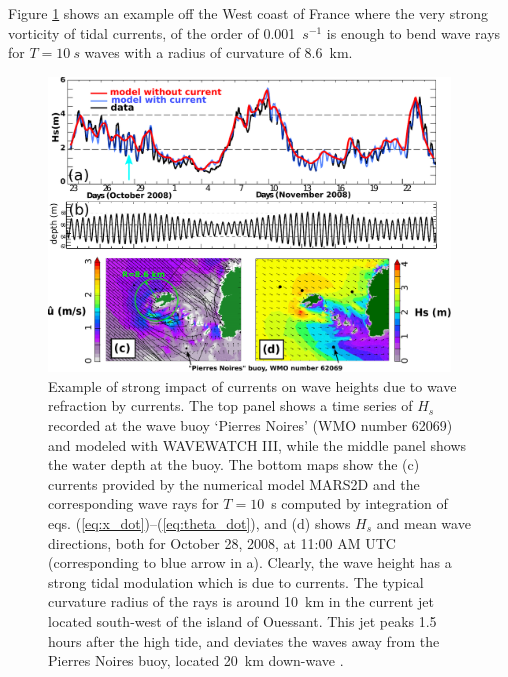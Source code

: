 Figure \ref{fig:PN_ref} shows an example off the West coast of France where the very strong vorticity of tidal currents, 
of the order of 0.001~$s^{-1}$ is enough to bend wave rays for $T=10~s$ waves with a radius of curvature of 8.6~km.
\begin{figure}[htb]
\centerline{\includegraphics[width=0.95\textwidth]{FIGS_CH_CURRENT/Pierres_Noires_refraction.pdf}}
  \caption{Example of strong impact of currents on wave heights due to wave refraction by currents. The top panel shows a time series of $H_s$ 
  recorded at the wave buoy `Pierres Noires' (WMO number 62069) and modeled with WAVEWATCH III, while the middle panel shows the water depth at the buoy. The bottom 
  maps show the (c) currents provided by the numerical model MARS2D and the corresponding wave rays for $T=10$~s 
  computed by integration of eqs. (\ref{eq:x_dot})--(\ref{eq:theta_dot}), and (d) shows  $H_s$ and mean wave directions, both
  for October 28, 2008, at 11:00 AM UTC (corresponding to blue arrow in a). Clearly, the wave height has a strong 
  tidal modulation which is due to currents. The typical curvature radius of the rays is around 10~km in the current jet located south-west of the island of Ouessant. 
  This jet peaks 1.5 hours after the high tide, and deviates the waves away from the Pierres Noires buoy, 
  located 20~km down-wave \citep[Adapted from][]{Ardhuin&al.2012b}.}
\label{fig:PN_ref}
\end{figure}

